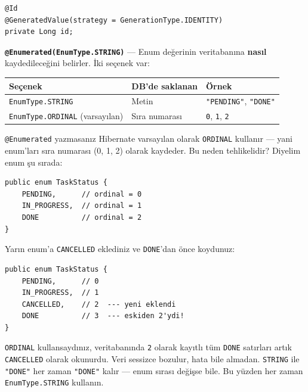 \documentclass[11pt,a4paper]{article}
\begin{document}
\begin{lstlisting}[style=java]
@Id
@GeneratedValue(strategy = GenerationType.IDENTITY)
private Long id;
\end{lstlisting}

\textbf{\texttt{@Enumerated(EnumType.STRING)}} --- Enum de\u{g}erinin veritaban{\i}na \textbf{nas{\i}l} kaydedilece\u{g}ini belirler. \.{I}ki se\c{c}enek var:

\begin{center}
\begin{tabular}{llp{5cm}}
\toprule
\textbf{Se\c{c}enek} & \textbf{DB'de saklanan} & \textbf{\"{O}rnek} \\
\midrule
\texttt{EnumType.STRING} & Metin & \texttt{"PENDING"}, \texttt{"DONE"} \\
\texttt{EnumType.ORDINAL} (varsay{\i}lan) & S{\i}ra numaras{\i} & \texttt{0}, \texttt{1}, \texttt{2} \\
\bottomrule
\end{tabular}
\end{center}

\begin{dangerbox}
\texttt{@Enumerated} yazmasan{\i}z Hibernate varsay{\i}lan olarak \texttt{ORDINAL} kullan{\i}r --- yani enum'lar{\i} s{\i}ra numaras{\i} (0, 1, 2) olarak kaydeder. Bu neden tehlikelidir? Diyelim enum \c{s}u s{\i}rada:

\begin{lstlisting}[style=java]
public enum TaskStatus {
    PENDING,      // ordinal = 0
    IN_PROGRESS,  // ordinal = 1
    DONE          // ordinal = 2
}
\end{lstlisting}

Yar{\i}n enum'a \texttt{CANCELLED} eklediniz ve \texttt{DONE}'dan \"{o}nce koydunuz:

\begin{lstlisting}[style=java]
public enum TaskStatus {
    PENDING,      // 0
    IN_PROGRESS,  // 1
    CANCELLED,    // 2  --- yeni eklendi
    DONE          // 3  --- eskiden 2'ydi!
}
\end{lstlisting}

\texttt{ORDINAL} kullansayd{\i}n{\i}z, veritaban{\i}nda \texttt{2} olarak kay{\i}tl{\i} t\"{u}m \texttt{DONE} sat{\i}rlar{\i} art{\i}k \texttt{CANCELLED} olarak okunurdu. Veri sessizce bozulur, hata bile almadan. \texttt{STRING} ile \texttt{"DONE"} her zaman \texttt{"DONE"} kal{\i}r --- enum s{\i}ras{\i} de\u{g}i\c{s}se bile. Bu y\"{u}zden her zaman \texttt{EnumType.STRING} kullan{\i}n.
\end{dangerbox}
\end{document}
